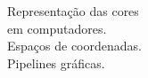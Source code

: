 \documentclass[preview]{standalone}
\begin{document}
Representação das cores \\ em computadores.\\Espaços de coordenadas.\\Pipelines gráficas.\\
\end{document}
